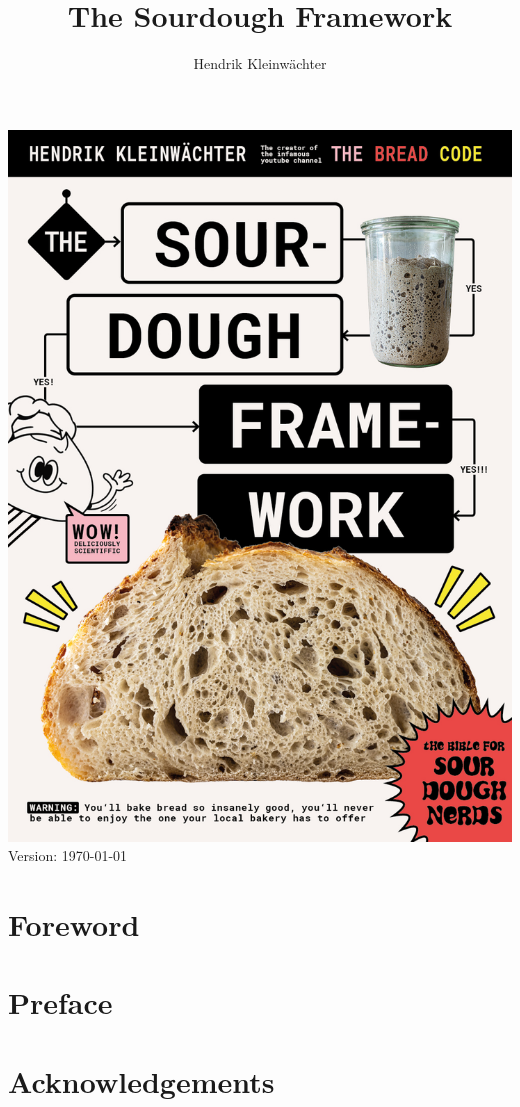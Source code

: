 \documentclass[a4paper, 12pt]{book}
\author{Hendrik Kleinwächter}
\title{The Sourdough Framework}
\begin{document}
\begin{titlepage}
	\centering
  \includegraphics[width=\textwidth]{cover-page}
  Version:
  \today
\end{titlepage}

\frontmatter

\tableofcontents

\chapter{Foreword}


\chapter{Preface}


\chapter{Acknowledgements}

\end{document}
